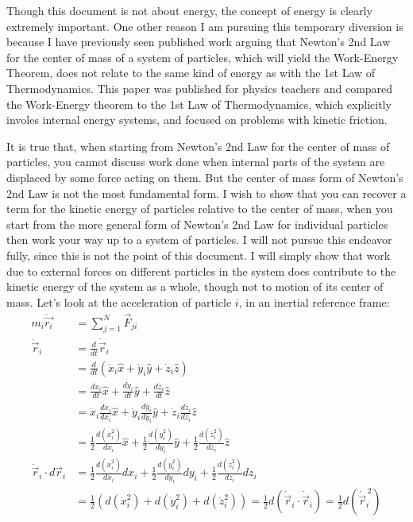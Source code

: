 \documentclass[10pt]{article}
\begin{document}
Though this document is not about energy, the concept of energy is clearly 
extremely important. One other reason I am pursuing this temporary 
diversion is because I have previously seen published work 
arguing that Newton's 2nd Law for the center of mass of 
a system of particles, which will yield 
the Work-Energy Theorem, does not relate to the same 
kind of energy as with the 1st Law of Thermodynamics. This paper was 
published for physics teachers and compared the Work-Energy theorem to 
the 1st Law of Thermodynamics, which explicitly involes internal energy 
systems, and focused on problems with kinetic friction. 

It is true that, when starting from Newton's 2nd Law for the center of 
mass of particles, you cannot discuss work done when internal parts of 
the system are displaced by some force acting on them. But the 
center of mass form of Newton's 2nd Law is not the most fundamental form. 
I wish to show that you can recover a term for the kinetic energy of 
particles relative to the center of mass, when you start from 
the more general form of Newton's 2nd Law for individual 
particles then work your way up to a system of particles.
I will not pursue this endeavor 
fully, since this is not the point of this document. 
I will simply show that work due to external forces on different particles in 
the system does contribute to the kinetic energy of the system as a whole, 
though not to motion of its center of mass. Let's 
look at the acceleration of particle $i$, in an inertial reference frame:
\begin{align*}
    m_i\ddot{\vec{r_i}} &= \sum_{j=1}^{N}\vec{F}_{ji} \\
    \ddot{\vec{r}}_i &= \frac{d}{dt}\dot{\vec{r}}_i \\
        &= \frac{d}{dt}\left(\dot{x}_i\hat{x}+\dot{y}_i\hat{y}+
            \dot{z}_i\hat{z}\right) \\
        &= \frac{d\dot{x}_i}{dt} \hat{x}
            +\frac{d\dot{y}_i}{dt} \hat{y}
            +\frac{d\dot{z}_i}{dt} \hat{z} \\
        &= \dot{x}_i\frac{d\dot{x}_i}{dx_i} \hat{x}
            +\dot{y}_i\frac{d\dot{y}_i}{dy_i} \hat{y}
            +\dot{z}_i\frac{d\dot{z}_i}{dz_i} \hat{z} \\
        &= \frac{1}{2} \frac{d (\dot{x}_i^2)}{dx_i}\hat{x}
            +\frac{1}{2} \frac{d (\dot{y}_i^2)}{dy_i}\hat{y}
            +\frac{1}{2} \frac{d (\dot{z}_i^2)}{dz_i}\hat{z} \\
    \ddot{\vec{r}}_i\cdot d\vec{r}_i &=
        \frac{1}{2} \frac{d (\dot{x}_i^2)}{dx_i}dx_i
            +\frac{1}{2} \frac{d (\dot{y}_i^2)}{dy_i}dy_i
            +\frac{1}{2} \frac{d (\dot{z}_i^2)}{dz_i}dz_i \\
    &=\frac{1}{2}\left( d (\dot{x}_i^2)
        +d (\dot{y}_i^2) +d (\dot{z}_i^2)\right)
        =\frac{1}{2}d (\dot{\vec{r}}_i\cdot\dot{\vec{r}}_i)
        = \frac{1}{2}d(\dot{\vec{r}}_i^{\,2})
\end{align*}
\end{document}
